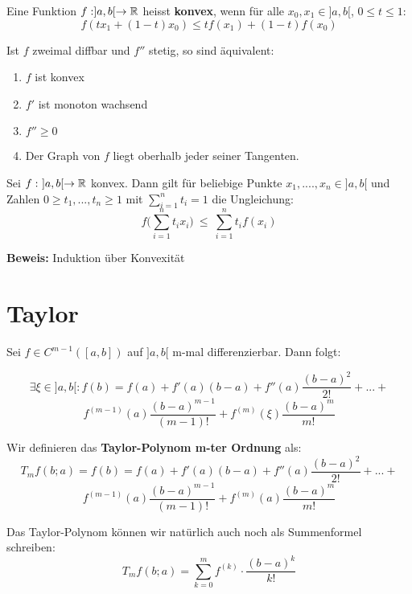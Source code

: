 \begin{definition}[Konvexität]
Eine Funktion $f: ]a,b[ \to \mathbb{R}$ heisst \textbf{konvex}, wenn für alle $x_0, x_1 \in ]a,b[$, $0\leq t \leq 1$:
$$f(tx_1 + (1-t)x_0) \leq tf(x_1) + (1-t)f(x_0)$$
\end{definition}

\begin{theorem}
Ist $f$ zweimal diffbar und $f''$ stetig, so sind äquivalent:
\begin{enumerate}
\item $f$ ist konvex
\item $f'$ ist monoton wachsend
\item $f'' \geq 0$
\item Der Graph von $f$ liegt oberhalb jeder seiner Tangenten.
\end{enumerate}
\end{theorem}

\begin{theorem}
Sei $f: \ ]a,b[ \to \mathbb{R}$ konvex.
Dann gilt für beliebige Punkte $x_1, .... , x_n \in ]a,b[$ und Zahlen $0\geq t_1,...,t_n \geq 1$ mit $\sum_{i=1}^n t_i = 1$ die Ungleichung:
$$f\Big(\sum_{i=1}^n t_i x_i \Big) \ \leq \ \sum_{i=1}^n t_i f(x_i)$$

\textbf{Beweis:} Induktion über Konvexität
\end{theorem}

\section{Taylor}

\begin{theorem}[Taylor]
Sei $f\in C^{m-1}([a,b])$ auf $]a,b[$ m-mal differenzierbar. Dann folgt:

$$\exists \xi \in ]a,b[:
f(b) = f(a) + f'(a)(b-a) + f''(a)\frac{(b-a)^2}{2!} + ... +$$
$$f^{(m-1)}(a)\frac{(b-a)^{m-1}}{(m-1)!} + f^{(m)}(\xi)\frac{(b-a)^m}{m!}$$
\end{theorem}

\begin{definition}
Wir definieren das \textbf{Taylor-Polynom m-ter Ordnung} als:
$$T_mf(b;a) = f(b) = f(a) + f'(a)(b-a) + f''(a)\frac{(b-a)^2}{2!} + ... +$$
$$f^{(m-1)}(a)\frac{(b-a)^{m-1}}{(m-1)!} + f^{(m)}(a)\frac{(b-a)^m}{m!}$$

Das Taylor-Polynom können wir natürlich auch noch als Summenformel schreiben:
$$T_mf(b;a) = \sum_{k=0}^m f^{(k)}\cdot\frac{(b-a)^k}{k!}$$
\end{definition}

